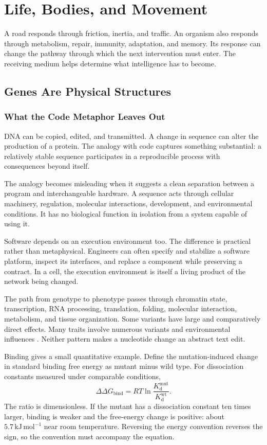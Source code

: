\chapter{Life, Bodies, and Movement}

A road responds through friction, inertia, and traffic. An organism also responds through metabolism, repair, immunity, adaptation, and memory. Its response can change the pathway through which the next intervention must enter. The receiving medium helps determine what intelligence has to become.

\section{Genes Are Physical Structures}

\subsection{What the Code Metaphor Leaves Out}

DNA can be copied, edited, and transmitted. A change in sequence can alter the production of a protein. The analogy with code captures something substantial: a relatively stable sequence participates in a reproducible process with consequences beyond itself.

The analogy becomes misleading when it suggests a clean separation between a program and interchangeable hardware. A sequence acts through cellular machinery, regulation, molecular interactions, development, and environmental conditions. It has no biological function in isolation from a system capable of using it.

Software depends on an execution environment too. The difference is practical rather than metaphysical. Engineers can often specify and stabilize a software platform, inspect its interfaces, and replace a component while preserving a contract. In a cell, the execution environment is itself a living product of the network being changed.

The path from genotype to phenotype passes through chromatin state, transcription, RNA processing, translation, folding, molecular interaction, metabolism, and tissue organization. Some variants have large and comparatively direct effects. Many traits involve numerous variants and environmental influences \cite{manolio2009finding}. Neither pattern makes a nucleotide change an abstract text edit.

Binding gives a small quantitative example. Define the mutation-induced change in standard binding free energy as mutant minus wild type. For dissociation constants measured under comparable conditions,
\begin{equation}
 \Delta\Delta G_{\mathrm{bind}}
 =RT\ln\frac{K_{\mathrm d}^{\mathrm{mut}}}
                 {K_{\mathrm d}^{\mathrm{wt}}}.
\end{equation}
The ratio is dimensionless. If the mutant has a dissociation constant ten times larger, binding is weaker and the free-energy change is positive: about $5.7\,\mathrm{kJ\,mol^{-1}}$ near room temperature. Reversing the energy convention reverses the sign, so the convention must accompany the equation.

